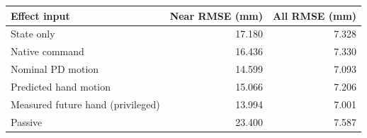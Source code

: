 \begin{tabular}{lrr}
\toprule
Effect input & Near RMSE (mm) & All RMSE (mm)\\
\midrule
State only & 17.180 & 7.328\\
Native command & 16.436 & 7.330\\
Nominal PD motion & 14.599 & 7.093\\
Predicted hand motion & 15.066 & 7.206\\
Measured future hand (privileged) & 13.994 & 7.001\\
Passive & 23.400 & 7.587\\
\bottomrule
\end{tabular}
